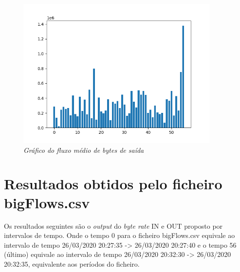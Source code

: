 \begin{figure}[h!]
    \label{high}
    \centering
    \includegraphics[width=0.9\textwidth]{Images/b1/b1_2.png}
    \caption{\textit{Gráfico do fluxo médio de bytes de saída}}
\end{figure}

\newpage

\section{Resultados obtidos pelo ficheiro bigFlows.csv}

Os resultados seguintes são o \textit{output} do \textit{byte rate} IN e OUT proposto por intervalos de tempo. Onde o tempo 0 para o ficheiro bigFlows.csv equivale ao intervalo de tempo 26/03/2020 20:27:35 -> 26/03/2020 20:27:40 e o tempo 56 (último) equivale ao intervalo de tempo 26/03/2020 20:32:30 -> 26/03/2020 20:32:35, equivalente aos períodos do ficheiro.


